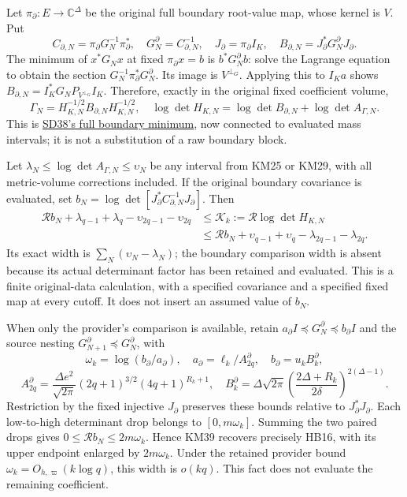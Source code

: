 \documentclass[11pt]{article}
\begin{document}
Let \(\pi_\partial:E\to\mathbb C^\Delta\) be the original full boundary root-value map, whose kernel is \(V\). Put \[
 C_{\partial,N}=\pi_\partial G_N^{-1}\pi_\partial^*,\quad
 G_N^\partial=C_{\partial,N}^{-1},\quad
 J_\partial=\pi_\partial I_K,\quad
 B_{\partial,N}=J_\partial^*G_N^\partial J_\partial.
 \tag{KM37}
\] The minimum of \(x^*G_Nx\) at fixed \(\pi_\partial x=b\) is \(b^*G_N^\partial b\): solve the Lagrange equation to obtain the section \(G_N^{-1}\pi_\partial^*G_N^\partial\). Its image is \(V^{\perp_G}\). Applying this to \(I_Ka\) shows \(B_{\partial,N}=I_K^*G_NP_{V^{\perp_G}}I_K\). Therefore, exactly in the original fixed coefficient volume, \[
 \Gamma_N=H_{K,N}^{-1/2}B_{\partial,N}H_{K,N}^{-1/2},\quad
 \log\det H_{K,N}
 =\log\det B_{\partial,N}+\log\det A_{\Gamma,N}.
 \tag{KM38}
\] This is \href{https://github.com/KokunoYumeto/zeta-function-research-reader/blob/e40b46fde72c245dd79ef5691f59c21d6cbf0c75/workbenches/splitzero-tandem/continuations/20260922-original-observation-recovery/SCALAR_RECOVERY_PROOFS.md\#L391}{SD38's full boundary minimum}, now connected to evaluated mass intervals; it is not a substitution of a raw boundary block.

Let \(\lambda_N\le\log\det A_{\Gamma,N}\le\upsilon_N\) be any interval from KM25 or KM29, with all metric-volume corrections included. If the original boundary covariance is evaluated, set \(b_N=\log\det[J_\partial^*C_{\partial,N}^{-1}J_\partial]\). Then \[
 \begin{split}
 \mathcal R b_N+\lambda_{q-1}+\lambda_q-\upsilon_{2q-1}-\upsilon_{2q}
 &\le\mathcal K_k:=\mathcal R\log\det H_{K,N}\\
 &\le\mathcal R b_N+\upsilon_{q-1}+\upsilon_q-\lambda_{2q-1}-\lambda_{2q}.
 \end{split}
 \tag{KM39}
\] Its exact width is \(\sum_N(\upsilon_N-\lambda_N)\); the boundary comparison width is absent because its actual determinant factor has been retained and evaluated. This is a finite original-data calculation, with a specified covariance and a specified fixed map at every cutoff. It does not insert an assumed value of \(b_N\).

When only the provider's comparison is available, retain \(a_\partial I\preceq G_N^\partial\preceq b_\partial I\) and the source nesting \(G_{N+1}^\partial\preceq G_N^\partial\), with \[
 \omega_k=\log(b_\partial/a_\partial),\quad
 a_\partial=\ell_k/A_{2q}^\partial,\quad b_\partial=u_kB_k^\partial,
\] \[
 A_{2q}^\partial=\frac{\Delta e^2}{\sqrt{2\pi}}
 (2q+1)^{3/2}(4q+1)^{R_k+1},\quad
 B_k^\partial=\Delta\sqrt{2\pi}
 \left(\frac{2\Delta+R_k}{2\delta}\right)^{2(\Delta-1)} .
 \tag{KM40}
\] Restriction by the fixed injective \(J_\partial\) preserves these bounds relative to \(J_\partial^*J_\partial\). Each low-to-high determinant drop belongs to \([0,m\omega_k]\). Summing the two paired drops gives \(0\le\mathcal Rb_N\le2m\omega_k\). Hence KM39 recovers precisely HB16, with its upper endpoint enlarged by \(2m\omega_k\). Under the retained provider bound \(\omega_k=O_{h,\varpi}(k\log q)\), this width is \(o(kq)\). This fact does not evaluate the remaining coefficient.
\end{document}
